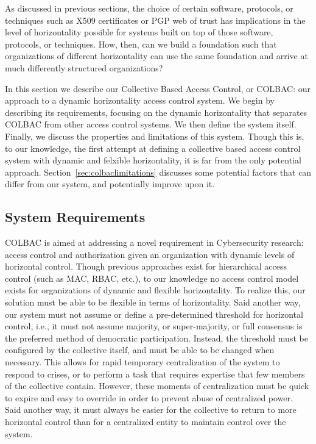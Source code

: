 As discussed in previous sections, the choice of certain software, protocols, or
techniques such as X509 certificates or PGP web of trust has implications in the
level of horizontality possible for systems built on top of those software,
protocols, or techniques. How, then, can we build a foundation such that
organizations of different horizontality can use the same foundation and arrive
at much differently structured organizations?

In this section we describe our Collective Based Access Control, or COLBAC: our
approach to a dynamic horizontality access control system. We begin by
describing its requirements, focusing on the dynamic horizontality that
separates COLBAC from other access control systems. We then define the system
itself. Finally, we discuss the properties and limitations of this system.
Though this is, to our knowledge, the first attempt at defining a collective
based access control system with dynamic and felxible horizontality, it is far
from the only potential approach. Section~\ref{sec:colbaclimitations} discusses
some potential factors that can differ from our system, and potentially improve
upon it.

\subsection{System Requirements}
\label{sec:colbacrequirements}
COLBAC is aimed at addressing a novel requirement in Cybersecurity research:
access control and authorization given an organization with dynamic levels of
horizontal control. Though previous approaches exist for hierarchical access
control (such as MAC, RBAC, etc.), to our knowledge no access control model
exists for organizations of dynamic and flexible horizontality. To realize
this, our solution must be able to be flexible in terms of horizontality. Said
another way, our system must not assume or define a pre-determined threshold for
horizontal control, i.e., it must not assume majority, or super-majority, or
full consensus is the preferred method of democratic participation. Instead,
the threshold must be configured by the collective itself, and must be able to
be changed when necessary. This allows for rapid temporary centralization of the
system to respond to crises, or to perform a task that requires expertise that
few members of the collective contain. However, these moments of centralization
must be quick to expire and easy to override in order to prevent abuse of
centralized power. Said another way, it must always be easier for the collective
to return to more horizontal control than for a centralized entity to maintain
control over the system.

